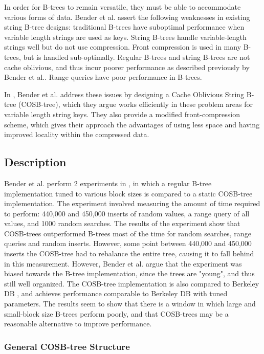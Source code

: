 \documentclass[preprint]{style}
\begin{document}
In order for B-trees to remain versatile, they must be able to accommodate
various forms of data. Bender et al. assert the following weaknesses in existing string B-tree designs: traditional B-trees have
suboptimal performance when variable length strings are used as keys\cite{BenderDemainColton}. String B-trees\cite{Ferragina98} handle variable-length strings well but do not use compression. Front compression\cite{BayerUn77,ClarkSaSt69,Comer79,Wagner73} is used in many B-trees, but is handled sub-optimally\cite{BenderFaKu06}. Regular B-trees and string B-trees are
not cache oblivious, and thus incur poorer performance as described
previously by Bender et al.\cite{BenderDemainColton}. Range queries have poor performance in B-trees\cite{BenderFaKu06}. 

In \cite{BenderFaKu06}, Bender et al. address these issues by designing a Cache
Oblivious String B-tree (COSB-tree), which they argue works efficiently in
these problem areas for variable length string keys. They also provide a
modified front-compression scheme, which gives their approach the advantages
of using less space and having improved locality within the compressed data.

\subsection{Description}
Bender et al. perform 2 experiments in \cite{BenderFaKu06}, in which a regular B-tree implementation tuned to various block sizes is compared to a static COSB-tree implementation. The experiment involved measuring the amount of time required to perform: 440,000 and 450,000 inserts of random values, a range query of all values, and 1000 random searches. The results of the experiment show that COSB-trees
outperformed B-trees most of the time for random searches, range queries and
random inserts. However, some point between 440,000 and 450,000 inserts the
COSB-tree had to rebalance the entire tree, causing it to fall behind in this
measurement. However, Bender et al. argue that the experiment was biased
towards the B-tree implementation, since the trees are "young", and thus still
well organized. The COSB-tree implementation is also compared to Berkeley DB
\cite{BerkeleyDB}, and achieves performance comparable to Berkeley DB with
tuned parameters. The results seem to show that there is a window in which
large and small-block size B-trees perform poorly, and that COSB-trees may be
a reasonable alternative to improve performance. 

\subsubsection{General COSB-tree Structure}
\end{document}
